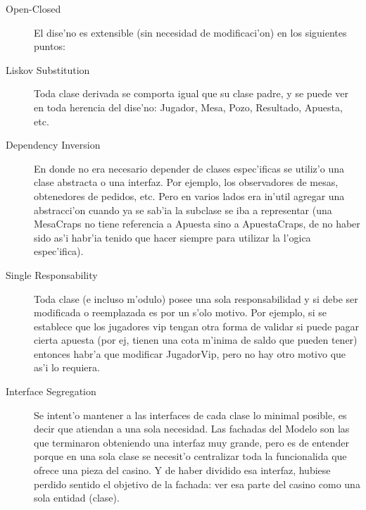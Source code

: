 \begin{description}
\item[Open-Closed] El dise'no es extensible (sin necesidad de modificaci'on) en los siguientes puntos:
\item[Liskov Substitution] Toda clase derivada se comporta igual que su clase padre, y se puede ver en toda herencia del dise'no: Jugador, Mesa, Pozo, Resultado, Apuesta, etc.
\item[Dependency Inversion] En donde no era necesario depender de clases espec'ificas se utiliz'o una clase abstracta o una interfaz. Por ejemplo, los observadores de mesas, obtenedores de pedidos, etc. Pero en varios lados era in'util agregar una abstracci'on cuando ya se sab'ia la subclase se iba a representar (una MesaCraps no tiene referencia a Apuesta sino a ApuestaCraps, de no haber sido as'i habr'ia tenido que hacer  siempre para utilizar la l'ogica espec'ifica).
\item[Single Responsability] Toda clase (e incluso m'odulo) posee una sola responsabilidad y si debe ser modificada o reemplazada es por un s'olo motivo. Por ejemplo, si se establece que los jugadores vip tengan otra forma de validar si puede pagar cierta apuesta (por ej, tienen una cota m'inima de saldo que pueden tener) entonces habr'a que modificar JugadorVip, pero no hay otro motivo que as'i lo requiera.
\item[Interface Segregation] Se intent'o mantener a las interfaces de cada clase lo minimal posible, es decir que atiendan a una sola necesidad. Las fachadas del Modelo son las que terminaron obteniendo una interfaz muy grande, pero es de entender porque en una sola clase se necesit'o centralizar toda la funcionalida que ofrece una pieza del casino. Y de haber dividido esa interfaz, hubiese perdido sentido el objetivo de la fachada: ver esa parte del casino como una sola entidad (clase).
\end{description}
